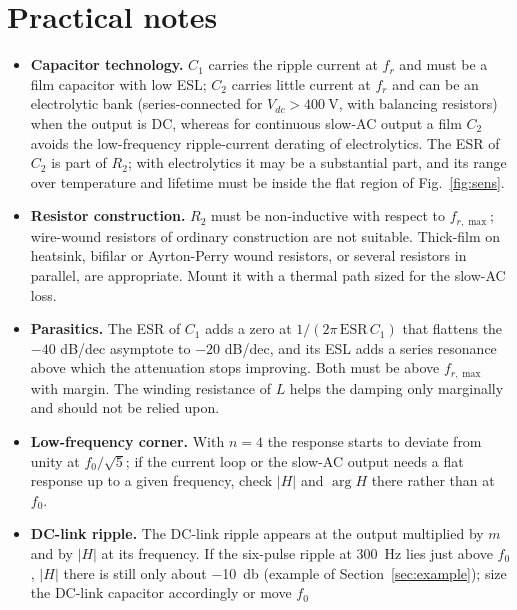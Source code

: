 \documentclass[11pt,a4paper]{article}
\begin{document}
\section{Practical notes}
\label{sec:practical}

\begin{itemize}[leftmargin=*]
\item \textbf{Capacitor technology.} $C_1$ carries the ripple current at $f_r$ and must be
      a film capacitor with low ESL; $C_2$ carries little current at $f_r$ and can be an
      electrolytic bank (series-connected for $V_{dc} > \SI{400}{\volt}$, with balancing
      resistors) when the output is DC, whereas for continuous slow-AC output a film
      $C_2$ avoids the low-frequency ripple-current derating of electrolytics. The ESR of
      $C_2$ is part of $R_2$; with electrolytics it may be a substantial part, and its
      range over temperature and lifetime must be inside the flat region of
      Fig.~\ref{fig:sens}.
\item \textbf{Resistor construction.} $R_2$ must be non-inductive with respect to
      $f_{r,\max}$; wire-wound resistors of ordinary construction are not suitable. Thick-film
      on heatsink, bifilar or Ayrton-Perry wound resistors, or several resistors in
      parallel, are appropriate. Mount it with a thermal path sized for the slow-AC loss.
\item \textbf{Parasitics.} The ESR of $C_1$ adds a zero at $1/(2\pi\,\mathrm{ESR}\,C_1)$
      that flattens the $-40$ dB/dec asymptote to $-20$ dB/dec, and its ESL adds a series
      resonance above which the attenuation stops improving. Both must be above
      $f_{r,\max}$ with margin. The winding resistance of $L$ helps the damping only
      marginally and should not be relied upon.
\item \textbf{Low-frequency corner.} With $n = 4$ the response starts to deviate from
      unity at $f_0/\sqrt 5$; if the current loop or the slow-AC output needs a flat
      response up to a given frequency, check $|H|$ and $\arg H$ there rather than at $f_0$.
\item \textbf{DC-link ripple.} The DC-link ripple appears at the output multiplied by $m$
      and by $|H|$ at its frequency. If the six-pulse ripple at \SI{300}{\hertz} lies just
      above $f_0$, $|H|$ there is still only about \SI{-10}{\decibel} (example of
      Section~\ref{sec:example}); size the DC-link capacitor accordingly or move $f_0$

\end{itemize}
\end{document}

